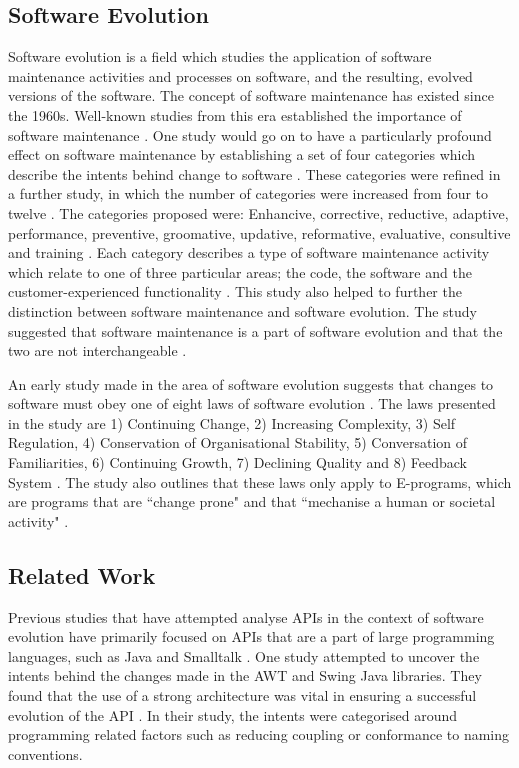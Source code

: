 \documentclass[conference]{IEEEtran}
\begin{document}
\subsection{Software Evolution} \label{software_evolution}
Software evolution is a field which studies the application of software maintenance activities and processes on software, and the resulting, evolved versions of the software. The concept of software maintenance has existed since the 1960s. Well-known studies from this era established the importance of software maintenance \cite{lientz1980software}. One study would go on to have a particularly profound effect on software maintenance by establishing a set of four categories which describe the intents behind change to software \cite{lientz1980software}. These categories were refined in a further study, in which the number of categories were increased from four to twelve \cite{chapin2001types}. The categories proposed were: Enhancive, corrective, reductive, adaptive, performance, preventive, groomative, updative, reformative, evaluative, consultive and training \cite{chapin2001types}. Each category describes a type of software maintenance activity which relate to one of three particular areas; the code, the software and the customer-experienced functionality \cite{chapin2001types}. This study also helped to further the distinction between software maintenance and software evolution. The study suggested that software maintenance is a part of software evolution and that the two are not interchangeable \cite{chapin2001types}. 

An early study made in the area of software evolution suggests that changes to software must obey one of eight laws of software evolution \cite{lehman1980programs}. The laws presented in the study are 1) Continuing Change, 2) Increasing Complexity, 3) Self Regulation, 4) Conservation of Organisational Stability, 5) Conversation of Familiarities, 6) Continuing Growth, 7) Declining Quality and 8) Feedback System \cite{lehman1980programs}. The study also outlines that these laws only apply to E-programs, which are programs that are ``change prone" and that ``mechanise a human or societal activity" \cite{lehman1980programs}.

\subsection{Related Work} \label{related_work}
Previous studies that have attempted analyse APIs in the context of software evolution have primarily focused on APIs that are a part of large programming languages, such as Java \cite{hou2011exploring} \cite{shi2011empirical} and Smalltalk \cite{robbes2012developers}. One study \cite{hou2011exploring} attempted to uncover the intents behind the changes made in the AWT and Swing Java libraries. They found that the use of a strong architecture was vital in ensuring a successful evolution of the API \cite{hou2011exploring}. In their study, the intents were categorised around programming related factors such as reducing coupling or conformance to naming conventions.
\end{document}
